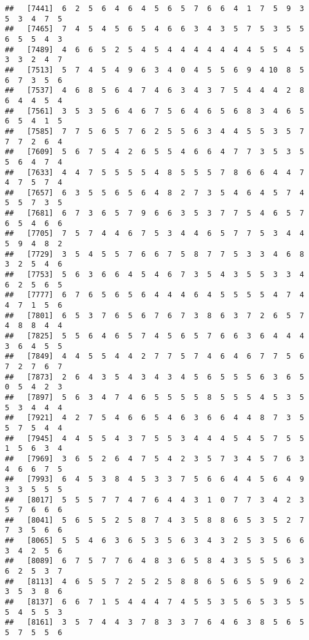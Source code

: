 \documentclass[
]{book}
\begin{document}
\begin{verbatim}
##   [7441]  6  2  5  6  4  6  4  5  6  5  7  6  6  4  1  7  5  9  3  5  3  4  7  5
##   [7465]  7  4  5  4  5  6  5  4  6  6  3  4  3  5  7  5  3  5  5  6  5  5  4  3
##   [7489]  4  6  6  5  2  5  4  5  4  4  4  4  4  4  4  5  5  4  5  3  3  2  4  7
##   [7513]  5  7  4  5  4  9  6  3  4  0  4  5  5  6  9  4 10  8  5  6  7  3  5  6
##   [7537]  4  6  8  5  6  4  7  4  6  3  4  3  7  5  4  4  4  2  8  6  4  4  5  4
##   [7561]  3  5  3  5  6  4  6  7  5  6  4  6  5  6  8  3  4  6  5  6  5  4  1  5
##   [7585]  7  7  5  6  5  7  6  2  5  5  6  3  4  4  5  5  3  5  7  7  7  2  6  4
##   [7609]  5  6  7  5  4  2  6  5  5  4  6  6  4  7  7  3  5  3  5  5  6  4  7  4
##   [7633]  4  4  7  5  5  5  5  4  8  5  5  5  7  8  6  6  4  4  7  4  7  5  7  4
##   [7657]  6  3  5  5  6  5  6  4  8  2  7  3  5  4  6  4  5  7  4  5  5  7  3  5
##   [7681]  6  7  3  6  5  7  9  6  6  3  5  3  7  7  5  4  6  5  7  6  5  4  6  6
##   [7705]  7  5  7  4  4  6  7  5  3  4  4  6  5  7  7  5  3  4  4  5  9  4  8  2
##   [7729]  3  5  4  5  5  7  6  6  7  5  8  7  7  5  3  3  4  6  8  3  2  5  4  6
##   [7753]  5  6  3  6  6  4  5  4  6  7  3  5  4  3  5  5  3  3  4  6  2  5  6  5
##   [7777]  6  7  6  5  6  5  6  4  4  4  6  4  5  5  5  5  4  7  4  4  7  1  5  6
##   [7801]  6  5  3  7  6  5  6  7  6  7  3  8  6  3  7  2  6  5  7  4  8  8  4  4
##   [7825]  5  5  6  4  6  5  7  4  5  6  5  7  6  6  3  6  4  4  4  3  6  4  5  5
##   [7849]  4  4  5  5  4  4  2  7  7  5  7  4  6  4  6  7  7  5  6  7  2  7  6  7
##   [7873]  2  6  4  3  5  4  3  4  3  4  5  6  5  5  5  6  3  6  5  0  5  4  2  3
##   [7897]  5  6  3  4  7  4  6  5  5  5  5  8  5  5  5  4  5  3  5  5  3  4  4  4
##   [7921]  4  2  7  5  4  6  6  5  4  6  3  6  6  4  4  8  7  3  5  5  7  5  4  4
##   [7945]  4  4  5  5  4  3  7  5  5  3  4  4  4  5  4  5  7  5  5  1  5  6  3  4
##   [7969]  3  6  5  2  6  4  7  5  4  2  3  5  7  3  4  5  7  6  3  4  6  6  7  5
##   [7993]  6  4  5  3  8  4  5  3  3  7  5  6  6  4  4  5  6  4  9  3  3  5  5  5
##   [8017]  5  5  5  7  7  4  7  6  4  4  3  1  0  7  7  3  4  2  3  5  7  6  6  6
##   [8041]  5  6  5  5  2  5  8  7  4  3  5  8  8  6  5  3  5  2  7  7  3  5  6  6
##   [8065]  5  5  4  6  3  6  5  3  5  6  3  4  3  2  5  3  5  6  6  3  4  2  5  6
##   [8089]  6  7  5  7  7  6  4  8  3  6  5  8  4  3  5  5  5  6  3  6  2  5  3  7
##   [8113]  4  6  5  5  7  2  5  2  5  8  8  6  5  6  5  5  9  6  2  3  5  3  8  6
##   [8137]  6  6  7  1  5  4  4  4  7  4  5  5  3  5  6  5  3  5  5  5  4  5  5  3
##   [8161]  3  5  7  4  4  3  7  8  3  3  7  6  4  6  3  8  5  6  5  5  7  5  5  6

\end{verbatim}
\end{document}
